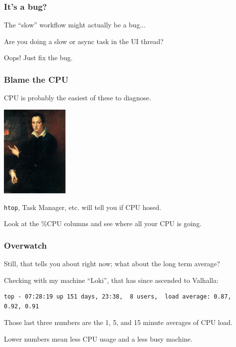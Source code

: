 \begin{frame}
\frametitle{It's a bug?}

The ``slow'' workflow might actually be a bug...

Are you doing a slow or async task in the UI thread?

Oops! Just fix the bug.

\end{frame}



\begin{frame}
\frametitle{Blame the CPU}



CPU is probably the easiest of these to diagnose.

\begin{center}
  \includegraphics[width=0.25\textwidth]{images/onfireyo.jpg}
\end{center}

\texttt{htop}, Task Manager, etc. will tell you if CPU hosed.


Look at the \%CPU columns and see where all your CPU is going. 



\end{frame}



\begin{frame}[fragile]
\frametitle{Overwatch}



Still, that tells you about right now;  what about the long term average?

Checking with my machine ``Loki'', that has since ascended to Valhalla:\\[1em]

{\scriptsize
\begin{verbatim}
top - 07:28:19 up 151 days, 23:38,  8 users,  load average: 0.87, 0.92, 0.91
\end{verbatim}
}

Those last three numbers are the 1, 5, and 15 minute averages of CPU load.

Lower numbers mean less CPU usage and a less busy machine. 


\end{frame}




